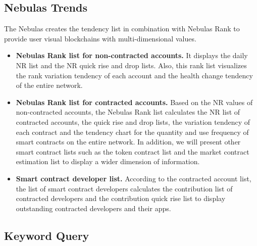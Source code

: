 \subsection{Nebulas Trends}

The Nebulas creates the tendency list in combination with Nebulas Rank to provide user visual blockchains with multi-dimensional values.

\begin{itemize}
\item \textbf{Nebulas Rank list for non-contracted accounts.} It displays the daily NR list and the NR quick rise and drop lists. Also, this rank list visualizes the rank variation tendency of each account and the health change tendency of the entire network.
\item \textbf{Nebulas Rank list for contracted accounts.} Based on the NR values of non-contracted accounts, the Nebulas Rank list calculates the NR list of contracted accounts, the quick rise and drop lists, the variation tendency of each contract and the tendency chart for the quantity and use frequency of smart contracts on the entire network. In addition, we will present other smart contract lists such as the token contract list and the market contract estimation list to display a wider dimension of information.
\item \textbf{Smart contract developer list.} According to the contracted account list, the list of smart contract developers calculates the contribution list of contracted developers and the contribution quick rise list to display outstanding contracted developers and their apps.
\end{itemize}

\subsection{Keyword Query}


